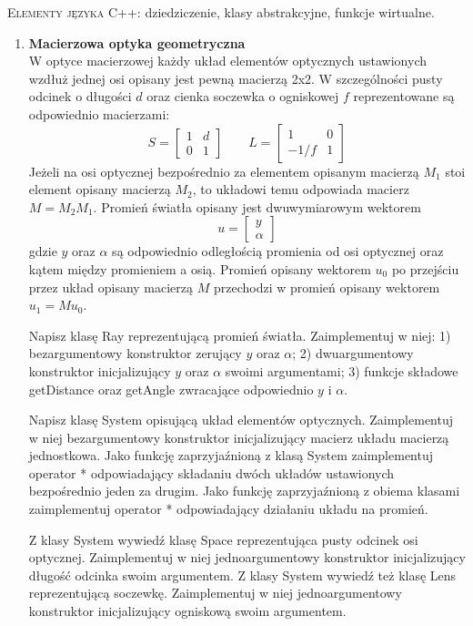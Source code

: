 \documentclass[12pt]{article}
\begin{document}
\small \textsc{Elementy języka C++:} dziedziczenie, klasy abstrakcyjne, funkcje wirtualne.

\begin{enumerate}

\item \textbf{Macierzowa optyka geometryczna}\\
W optyce macierzowej każdy układ elementów optycznych ustawionych wzdłuż jednej osi opisany
jest pewną macierzą \textsf{2x2}. W szczególności pusty odcinek o długości $d$ oraz cienka soczewka o ogniskowej
$f$ reprezentowane są odpowiednio macierzami:
\[
S=
  \begin{bmatrix}
    1 & d \\
    0 & 1
  \end{bmatrix}
  \quad \quad
  L=
  \begin{bmatrix}
    1 & 0 \\
    -1/f & 1
  \end{bmatrix}
\]
Jeżeli na osi optycznej bezpośrednio za elementem opisanym macierzą $M_1$ stoi element opisany macierzą
$M_2$, to układowi temu odpowiada macierz $M = M_2M_1$. Promień światła opisany jest dwuwymiarowym
wektorem
\[
u=
  \begin{bmatrix}
    y \\
    \alpha
  \end{bmatrix}
\]
gdzie $y$ oraz $\alpha$ są odpowiednio odległością promienia od osi optycznej oraz kątem między promieniem a
osią. Promień opisany wektorem $u_0$ po przejściu przez układ opisany macierzą $M$ przechodzi w promień
opisany wektorem $u_1=Mu_0$.

Napisz klasę \textsf{Ray} reprezentującą promień światła. Zaimplementuj w niej:
1) bezargumentowy konstruktor zerujący $y$ oraz $\alpha$;
2) dwuargumentowy konstruktor inicjalizujący $y$ oraz $\alpha$ swoimi argumentami;
3) funkcje składowe \textsf{getDistance} oraz \textsf{getAngle} zwracające odpowiednio $y$ i $\alpha$.

Napisz klasę \textsf{System} opisującą układ elementów optycznych. Zaimplementuj w niej bezargumentowy
konstruktor inicjalizujący macierz układu macierzą jednostkowa.
Jako funkcję zaprzyjaźnioną z klasą \textsf{System} zaimplementuj operator \textsf{*} odpowiadający składaniu dwóch
układów ustawionych bezpośrednio jeden za drugim. Jako funkcję zaprzyjaźnioną z obiema klasami zaimplementuj
operator \textsf{*} odpowiadający działaniu układu na promień.

Z klasy \textsf{System} wywiedź klasę \textsf{Space} reprezentująca pusty odcinek osi optycznej. Zaimplementuj w
niej jednoargumentowy konstruktor inicjalizujący długość odcinka swoim argumentem. Z klasy \textsf{System}
wywiedź też klasę \textsf{Lens} reprezentującą soczewkę. Zaimplementuj w niej jednoargumentowy konstruktor
inicjalizujący ogniskową swoim argumentem.


\end{enumerate}
\end{document}
